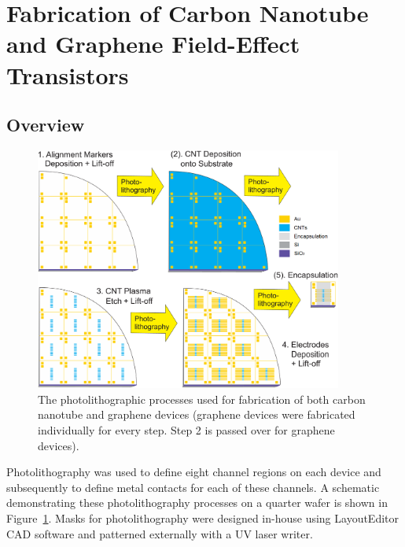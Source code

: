 \documentclass[
  a4paper,
]{scrbook}
\begin{document}
\hypertarget{sec-qw-processing}{%
\section{Fabrication of Carbon Nanotube and Graphene Field-Effect
Transistors}\label{sec-qw-processing}}

\hypertarget{overview}{%
\subsection{Overview}\label{overview}}

\begin{figure}

{\centering \includegraphics[width=0.9\textwidth,height=\textheight]{figures/ch4/photolithography-cycle.png}

}

\caption{\label{fig-qw-photolithography}The photolithographic processes
used for fabrication of both carbon nanotube and graphene devices
(graphene devices were fabricated individually for every step. Step 2 is
passed over for graphene devices).}

\end{figure}

Photolithography was used to define eight channel regions on each device
and subsequently to define metal contacts for each of these channels. A
schematic demonstrating these photolithography processes on a quarter
wafer is shown in Figure~\ref{fig-qw-photolithography}. Masks for
photolithography were designed in-house using LayoutEditor CAD software
and patterned externally with a UV laser writer.
\end{document}
